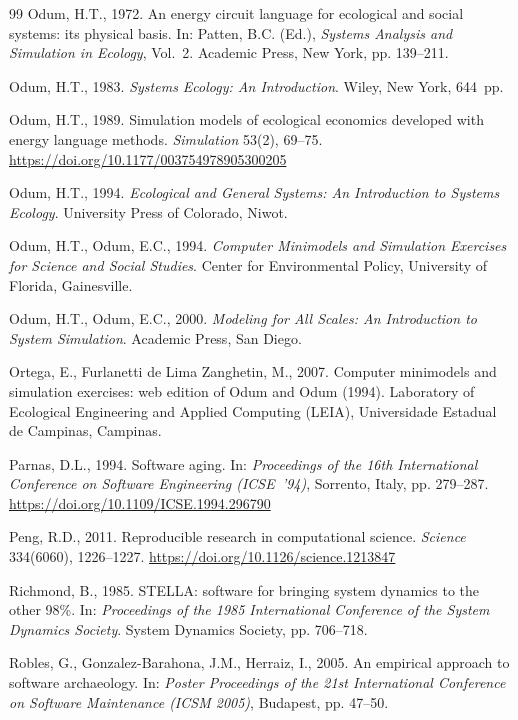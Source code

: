 \documentclass[11pt,a4paper]{article}
\begin{document}
\begin{thebibliography}{99}
Odum, H.T., 1972. An energy circuit language for ecological and social systems: its physical basis. In: Patten, B.C. (Ed.), \emph{Systems Analysis and Simulation in Ecology}, Vol.~2. Academic Press, New York, pp. 139--211.

Odum, H.T., 1983. \emph{Systems Ecology: An Introduction}. Wiley, New York, 644~pp.

Odum, H.T., 1989. Simulation models of ecological economics developed with energy language methods. \emph{Simulation} 53(2), 69--75. \url{https://doi.org/10.1177/003754978905300205}

Odum, H.T., 1994. \emph{Ecological and General Systems: An Introduction to Systems Ecology}. University Press of Colorado, Niwot.

Odum, H.T., Odum, E.C., 1994. \emph{Computer Minimodels and Simulation Exercises for Science and Social Studies}. Center for Environmental Policy, University of Florida, Gainesville.

Odum, H.T., Odum, E.C., 2000. \emph{Modeling for All Scales: An Introduction to System Simulation}. Academic Press, San Diego.

Ortega, E., Furlanetti de Lima Zanghetin, M., 2007. Computer minimodels and simulation exercises: web edition of Odum and Odum (1994). Laboratory of Ecological Engineering and Applied Computing (LEIA), Universidade Estadual de Campinas, Campinas.

Parnas, D.L., 1994. Software aging. In: \emph{Proceedings of the 16th International Conference on Software Engineering (ICSE~'94)}, Sorrento, Italy, pp. 279--287. \url{https://doi.org/10.1109/ICSE.1994.296790}

Peng, R.D., 2011. Reproducible research in computational science. \emph{Science} 334(6060), 1226--1227. \url{https://doi.org/10.1126/science.1213847}

Richmond, B., 1985. STELLA: software for bringing system dynamics to the other 98\%. In: \emph{Proceedings of the 1985 International Conference of the System Dynamics Society}. System Dynamics Society, pp. 706--718.

Robles, G., Gonzalez-Barahona, J.M., Herraiz, I., 2005. An empirical approach to software archaeology. In: \emph{Poster Proceedings of the 21st International Conference on Software Maintenance (ICSM 2005)}, Budapest, pp. 47--50.


\end{thebibliography}
\end{document}

